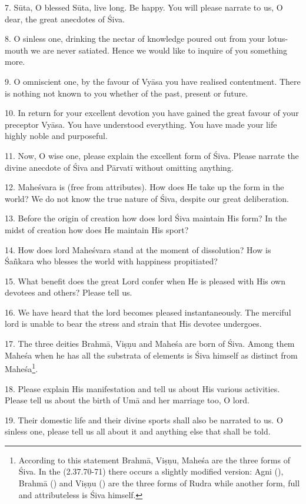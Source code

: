 7. Sūta, O blessed Sūta, live long. Be happy. You will please narrate to us,
O dear, the great anecdotes of Śiva.

8. O sinless one, drinking the nectar of knowledge poured out from your
lotus-mouth we are never satiated. Hence we would like to inquire of you
something more.

9. O omniscient one, by the favour of Vyāsa you have realised contentment. There
is nothing not known to you whether of the past, present or future.

10. In return for your excellent devotion you have gained the great favour of
your preceptor Vyāsa. You have understood everything. You have made your life
highly noble and purposeful.

11. Now, O wise one, please explain the excellent form of Śiva. Please narrate
the divine anecdote of Śiva and Pārvatī without omitting anything.

12. Maheśvara is  (free from attributes). How does He take up
the  form in the world? We do not know the true nature of Śiva,
despite our great deliberation.

13. Before the origin of creation how does lord Śiva maintain His form? In
the midst of creation how does He maintain His sport?

14. How does lord Maheśvara stand at the moment of dissolution? How is Śañkara
who blesses the world with happiness propitiated?

15. What benefit does the great Lord confer when He is pleased with His own
devotees and others? Please tell us.

16. We have heard that the lord becomes pleased instantaneously. The merciful
lord is unable to bear the stress and strain that His devotee undergoes.

17. The three deities Brahmā, Viṣṇu and Maheśa are born of Śiva. Among them
Maheśa when he has all the substrata of elements is Śiva himself as distinct
from Maheśa\footnote{According to this statement Brahmā, Viṣṇu, Maheśa are
the three forms of Śiva. In the  (2.37.70-71) there occurs a
slightly modified version: Agni (), Brahmā () and Viṣṇu
() are the three forms of Rudra while another form, full and
attributeless is Śiva himself.}.

18. Please explain His manifestation and tell us about His various activities.
Please tell us about the birth of Umā and her marriage too, O lord.

19. Their domestic life and their divine sports shall also be narrated to us.
O sinless one, please tell us all about it and anything else that shall be told.

